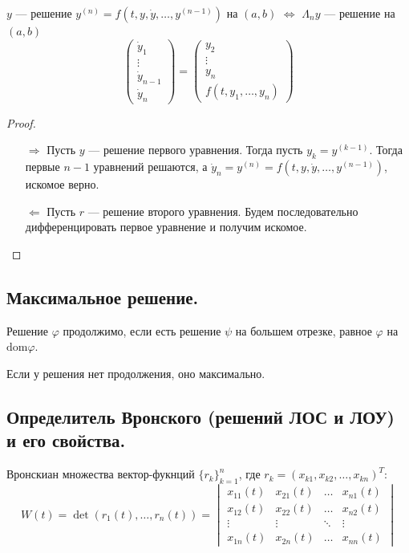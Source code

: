 \begin{lemma}
    \(y\) --- решение \(y^{(n)} = f(t, y, \dot{y}, \dots , y^{(n - 1)})\) на \((a, b)\) \(\Leftrightarrow\) \(\Lambda_n y\) --- решение на \((a, b)\) \[\begin{pmatrix} \dot{y}_1 \\ \vdots \\ \dot{y}_{n - 1} \\ \dot{y}_{n} \end{pmatrix} = \begin{pmatrix} y_2 \\ \vdots \\ y_n \\ f(t, y_1, \dots , y_n) \end{pmatrix} \]
\end{lemma}
\begin{proof}\itemfix
    \begin{itemize}
        \item [\( \Rightarrow \)] Пусть \(y\) --- решение первого уравнения. Тогда пусть \(y_k = y^{(k - 1)}\). Тогда первые \(n - 1\) уравнений решаются, а \(\dot{y}_n = y^{(n)} = f(t, y, \dot{y}, \dots , y^{(n - 1)})\), искомое верно.
        \item [\( \Leftarrow \)] Пусть \(r\) --- решение второго уравнения. Будем последовательно дифференцировать первое уравнение и получим искомое.
    \end{itemize}
\end{proof}

\subsection*{Максимальное решение.}

Решение \(\varphi\) продолжимо, если есть решение \(\psi\) на большем отрезке, равное \(\varphi\) на \(\text{dom} \varphi\).

Если у решения нет продолжения, оно максимально.

\subsection*{Определитель Вронского (решений ЛОС и ЛОУ) и его свойства.}

Вронскиан множества вектор-фукнций \(\{r_k\}_{k = 1}^n\), где \(r_k = (x_{k1}, x_{k2}, \dots, x_{kn})^T\):
\[W(t) = \det (r_1(t), \dots , r_n(t)) = \begin{vmatrix} x_{11}(t) & x_{21}(t) & \dots & x_{n1}(t) \\ x_{12}(t) & x_{22}(t) & \dots & x_{n2}(t) \\ \vdots & \vdots & \ddots & \vdots \\ x_{1n}(t) & x_{2n}(t) & \dots & x_{nn}(t) \end{vmatrix} \]

